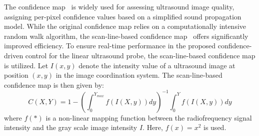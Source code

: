 \par
The confidence map~\cite{karamalis2012ultrasound} is widely used for assessing ultrasound image quality, assigning per-pixel confidence values based on a simplified sound propagation model. While the original confidence map relies on a computationally intensive random walk algorithm, the scan-line-based confidence map~\cite{chatelain2016quality} offers significantly improved efficiency.
To ensure real-time performance in the proposed confidence-driven control for the linear ultrasound probe, the scan-line-based confidence map is utilized. Let $I(x,y)$ denote the intensity value of a ultrasound image at position $(x,y)$ in the image coordination system. The scan-line-based confidence map is then given by:
\begin{equation}
    C(X,Y)=1-\left(\int_{0}^{{Y}_{max}}f(I(X,y))dy\right)^{-1}\int_{0}^{Y}f(I(X,y))dy
\end{equation}
where $f(*)$ is a non-linear mapping function between the radiofrequency signal intensity and the gray scale image intensity $I$. Here, $f(x) = x^{2}$ is used.

